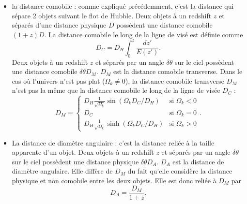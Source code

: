 \documentclass[11pt, twoside, a4paper, openright]{report}
\begin{document}
\begin{itemize}[label=$\bullet$]
\item la distance comobile : comme expliqué précédemment, c'est la distance qui sépare 2 objets suivant le flot de Hubble. Deux objets à un redshift $z$ et séparés d'une distance physique $D$ possèdent une distance comobile $(1+z)D$. La distance comobile le long de la ligne de visé est définie comme
  \begin{equation}
    \label{eq:dist_como}
    D_{C} = D_H \int_0^z \frac{dz'}{E(z')} .
  \end{equation}
  Deux objets à un redshift $z$ et séparés par un angle $\delta \theta$ sur le ciel possèdent une distance comobile $\delta \theta D_M$. $D_M$ est la distance comobile transverse. 
  Dans le cas où l'univers n'est pas plat ($\Omega_k \neq 0$), la distance comobile transverse $D_M$  n'est pas la même que la distance comobile le long de la ligne de visée $D_{C}$ :
  \begin{equation}
    \label{eq:dist_como_trans}
    D_M = \left\{
      \begin{array}{ll}
        D_H \frac{1}{\sqrt{\Omega_k}} \sin(\Omega_k D_C / D_H) & \mbox{si } \Omega_k < 0 \\
        D_C & \textrm{si } \Omega_k = 0 \\
        D_H \frac{1}{\sqrt{\Omega_k}} \sinh(\Omega_k D_C / D_H) & \mbox{si } \Omega_k > 0
      \end{array}
    \right..
  \end{equation}
  
\item La distance de diamètre angulaire : c'est la distance reliée à la taille apparente d'un objet. Deux objets à un redshift $z$ et séparés par un angle $\delta \theta$ sur le ciel possèdent une distance physique $\delta \theta D_A$. $D_A$ est la distance de diamètre angulaire. Elle diffère de $D_M$ du fait qu'elle considère la distance physique et non comobile entre les deux objets. Elle est donc reliée à $D_M$ par
  \begin{equation}
    \label{eq:dist_ang}
    D_A = \frac{D_M}{1+z}.
  \end{equation}


\end{itemize}
\end{document}
